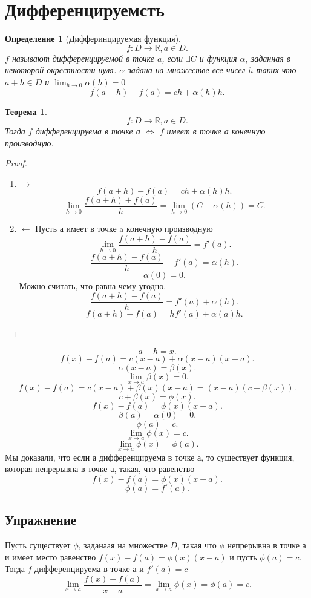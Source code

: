 \documentclass[a4paper]{scrartcl}
\newtheorem{theorem}{Теорема}
\newtheorem{definition}{Определение}
\begin{document}
\section{Дифференцируемсть}
\begin{definition}[Дифферинцируемая функция]
	\[
		f : D \to \mathbb{R},  a \in D
		.\]
	$f$ называют дифференцируемой в точке  $a$, если  $\exists  C$ и функция $\alpha$, заданная в некоторой окрестности нуля. $\alpha$ задана на множестве все чисел  $h$ таких что  $a + h \in D$ и $\lim_{h \to 0} \alpha(h) = 0$
	\[
		f(a + h ) - f(a) = ch + \alpha(h)h
		.\]
\end{definition}
\begin{theorem}
	\[
		f : D \to \mathbb{R}, a\in D
		.\]
	Тогда $f$ дифференцируема в точке а  $\iff$  $f$ имеет в точке а конечную производную.
\end{theorem}
\begin{proof}
	\begin{enumerate}
		\item $\rightarrow$
		      \[
			      f(a + h) - f(a) = ch + \alpha(h)h
			      .\]
		      \[
			      \lim_{h \to 0} \frac{f(a + h) + f(a)}{h} = \lim_{h \to 0} (C + \alpha(h)) =  C
			      .\]
		\item $\leftarrow$
		      Пусть $а$ имеет в точке a конечную производную
		      \[
			      \lim_{h \to 0} \frac{f(a + h) - f(a)}{h} =  f'(a)
			      .\]
		      \[
			      \frac{f(a + h) - f(a)}{h} - f'(a) = \alpha(h)
			      .\]
		      \[
			      \alpha(0) = 0
			      .\]
		      Можно считать, что равна чему угодно.
		      \[
			      \frac{f(a + h) - f(a)}{h} = f'(a) + \alpha(h)
			      .\]
		      \[
			      f(a + h) - f(a) = hf'(a) + \alpha(a)h
			      .\]
	\end{enumerate}
\end{proof}
\[
	a + h = x
	.\]
\[
	f(x) - f(a) = c(x - a) + \alpha(x - a)(x  - a)
	.\]
\[
	\alpha(x - a) =  \beta(x)
	.\]
\[
	\lim_{x \to a} \beta(x) = 0
	.\]
\[
	f(x) - f(a) = c(x - a) + \beta(x)(x  - a)= (x - a)(c + \beta(x))
	.\]
\[
	c + \beta(x) = \phi(x)
	.\]
\[
	f(x) - f(a) = \phi{(x)}(x-a)
	.\]
\[
	\beta(a) = \alpha(0) = 0
	.\]
\[
	\phi(a) =  c
	.\]
\[
	\lim_{x \to a} \phi(x) = c
	.\]
\[
	\lim_{x \to a} \phi(x) = \phi(a)
	.\]
Мы доказали, что если а дифференцируема в точке а, то существует функция, которая непрерывна в точке а, такая, что равенство
\[
	f(x) - f(a) = \phi(x)(x - a)
	.\]
\[
	\phi(a) = f'(a)
	.\]
\subsection{Упражнение}
Пусть существует $\phi$, заданаая на множестве  $D$, такая что  $\phi$ непрерывна в точке а и имеет место равенство  $f(x)  - f(a) = \phi(x)(x - a)$ и пусть  $\phi(a) =  c$. Тогда  $f$ дифференцируема в точке а и  $f'(a) = c$
\[
	\lim_{x \to a} \frac{f(x) - f(a)}{x - a} = \lim_{x \to a} \phi(x) = \phi(a) = c
	.\]
\end{document}
